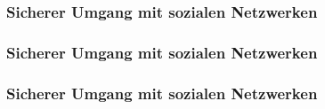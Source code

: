 \begin{frame}
\frametitle{Sicherer Umgang mit sozialen Netzwerken}
\begin{itemize}
  
\end{itemize}
\end{frame}

\begin{frame}
\frametitle{Sicherer Umgang mit sozialen Netzwerken}
\begin{itemize}
  
\end{itemize}
\end{frame}

\begin{frame}
\frametitle{Sicherer Umgang mit sozialen Netzwerken}
\begin{itemize}
  
\end{itemize}
\end{frame}